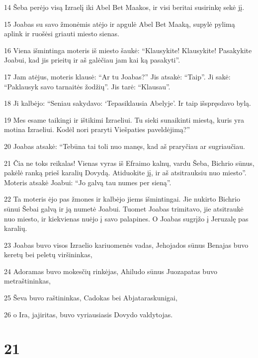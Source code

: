 \par 14 Šeba perėjo visą Izraelį iki Abel Bet Maakos, ir visi beritai susirinkę sekė jį. 
\par 15 Joabas su savo žmonėmis atėjo ir apgulė Abel Bet Maaką, supylė pylimą aplink ir ruošėsi griauti miesto sienas. 
\par 16 Viena išmintinga moteris iš miesto šaukė: “Klausykite! Klausykite! Pasakykite Joabui, kad jis prieitų ir aš galėčiau jam kai ką pasakyti”. 
\par 17 Jam atėjus, moteris klausė: “Ar tu Joabas?” Jis atsakė: “Taip”. Ji sakė: “Paklausyk savo tarnaitės žodžių”. Jis tarė: “Klausau”. 
\par 18 Ji kalbėjo: “Seniau sakydavo: ‘Tepasiklausia Abelyje’. Ir taip išspręsdavo bylą. 
\par 19 Mes esame taikingi ir ištikimi Izraeliui. Tu sieki sunaikinti miestą, kuris yra motina Izraeliui. Kodėl nori praryti Viešpaties paveldėjimą?” 
\par 20 Joabas atsakė: “Tebūna tai toli nuo manęs, kad aš praryčiau ar sugriaučiau. 
\par 21 Čia ne toks reikalas! Vienas vyras iš Efraimo kalnų, vardu Šeba, Bichrio sūnus, pakėlė ranką prieš karalių Dovydą. Atiduokite jį, ir aš atsitrauksiu nuo miesto”. Moteris atsakė Joabui: “Jo galvą tau numes per sieną”. 
\par 22 Ta moteris ėjo pas žmones ir kalbėjo jiems išmintingai. Jie nukirto Bichrio sūnui Šebai galvą ir ją numetė Joabui. Tuomet Joabas trimitavo, jie atsitraukė nuo miesto, ir kiekvienas nuėjo į savo palapines. O Joabas sugrįžo į Jeruzalę pas karalių. 
\par 23 Joabas buvo visos Izraelio kariuomenės vadas, Jehojados sūnus Benajas buvo keretų bei peletų viršininkas, 
\par 24 Adoramas buvo mokesčių rinkėjas, Ahiludo sūnus Juozapatas buvo metraštininkas, 
\par 25 Ševa buvo raštininkas, Cadokas bei Abjataras­kunigai, 
\par 26 o Ira, jajiritas, buvo vyriausiasis Dovydo valdytojas.



\chapter{21}

